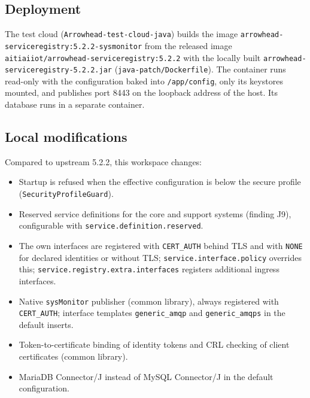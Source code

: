 \documentclass[a4paper]{arrowhead}
\begin{document}
\subsection{Deployment}

The test cloud (\texttt{Arrowhead-test-cloud-java}) builds the image \texttt{arrowhead-\allowbreak{}serviceregistry:5.\allowbreak{}2.\allowbreak{}2-\allowbreak{}sysmonitor} from the released image \texttt{aitiaiiot/\allowbreak{}arrowhead-\allowbreak{}serviceregistry:5.\allowbreak{}2.\allowbreak{}2} with the locally built \texttt{arrowhead-\allowbreak{}serviceregistry-\allowbreak{}5.\allowbreak{}2.\allowbreak{}2.\allowbreak{}jar} (\texttt{java-patch/Dockerfile}). The container runs read-only with the configuration baked into \texttt{/app/config}, only its keystores mounted, and publishes port 8443 on the loopback address of the host. Its database runs in a separate container.

\subsection{Local modifications}
\label{sec:local}

Compared to upstream 5.2.2, this workspace changes:
\begin{itemize}
  \item Startup is refused when the effective configuration is below the secure profile (\texttt{Security\allowbreak{}Profile\allowbreak{}Guard}).
  \item Reserved service definitions for the core and support systems (finding J9), configurable with \texttt{service.\allowbreak{}definition.\allowbreak{}reserved}.
  \item The own interfaces are registered with \texttt{CERT\_\allowbreak{}AUTH} behind TLS and with \texttt{NONE} for declared identities or without TLS; \texttt{service.\allowbreak{}interface.\allowbreak{}policy} overrides this; \texttt{service.\allowbreak{}registry.\allowbreak{}extra.\allowbreak{}interfaces} registers additional ingress interfaces.
  \item Native \texttt{sysMonitor} publisher (common library), always registered with \texttt{CERT\_\allowbreak{}AUTH}; interface templates \texttt{generic\_\allowbreak{}amqp} and \texttt{generic\_\allowbreak{}amqps} in the default inserts.
  \item Token-to-certificate binding of identity tokens and CRL checking of client certificates (common library).
  \item MariaDB Connector/J instead of MySQL Connector/J in the default configuration.
\end{itemize}
\end{document}
